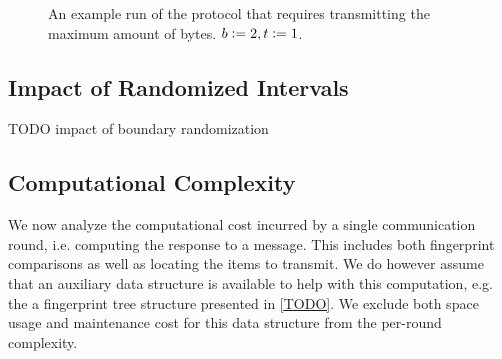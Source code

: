 \begin{figure*}
\begin{scaletikzpicturetowidth}{\textwidth}
\end{scaletikzpicturetowidth}

\caption{An example run of the protocol that requires transmitting the maximum amount of bytes. $b \vcentcolon= 2, t \vcentcolon= 1$.}

\label{fig:worst-bytes}
\end{figure*}

\subsection{Impact of Randomized Intervals}
\label{random-boundaries}

TODO impact of boundary randomization

\subsection{Computational Complexity}

We now analyze the computational cost incurred by a single communication round, i.e. computing the response to a message. This includes both fingerprint comparisons as well as locating the items to transmit. We do however assume that an auxiliary data structure is available to help with this computation, e.g. the a fingerprint tree structure presented in \cref{TODO}. We exclude both space usage and maintenance cost for this data structure from the per-round complexity.

